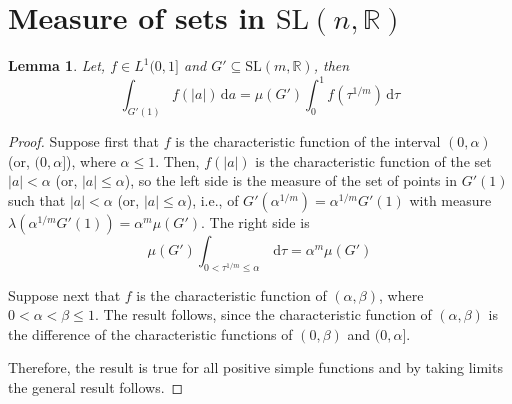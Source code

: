 \documentclass[11pt]{article}
\newtheorem{lemma}[theorem]{Lemma}
\theoremstyle{definition}
\begin{document}
\section{Measure of sets in $\mathrm{SL}(n,\mathbb{R})$}
\begin{lemma}\label{lem1.8.1}
    Let, $f \in L^1(0,1]$ and $G' \subseteq \mathrm{SL}(m, \mathbb{R})$, then
    \[	
        \int_{G'(1)} f(|a|) \, \mathrm{d} a = \mu (G') \int_{0}^{1} f( \tau ^{1/m}) \, \mathrm{d} \tau
    \]
\end{lemma}
\begin{proof}
    Suppose first that $f$ is the characteristic function of the interval $(0,\alpha )$ (or, $(0, \alpha ]$), where $\alpha \leq 1$.
    Then, $f(|a|)$ is the characteristic function of the set $|a| < \alpha $ (or, $|a| \leq \alpha $), so the left side is the measure of the set of points in $G'(1)$ such that $|a| < \alpha $ (or, $|a| \leq \alpha $), i.e., of $G'(\alpha ^{1/m})= \alpha ^{1/m}G'(1)$ with measure $\lambda(\alpha ^{1/m} G'(1))= \alpha ^m \mu (G')$.
    The right side is
    \[	
        \mu (G') \int_{0 < \tau ^{1/m} \le \alpha } \, \mathrm{d} \tau = \alpha ^m \mu (G')
    \]

    Suppose next that $f$ is the characteristic function of $(\alpha , \beta )$, where $0 < \alpha < \beta \le 1$.
    The result follows, since the characteristic function of $(\alpha , \beta )$ is the difference of the characteristic functions of $(0, \beta )$ and $(0, \alpha ]$.

    Therefore, the result is true for all positive simple functions and by taking limits the general result follows.
\end{proof}
\end{document}
